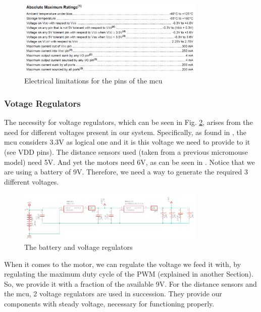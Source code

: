 \begin{figure}[htb]
    \centering
    \includegraphics[width=0.8\textwidth]{figures/hardware/Electrical.PNG}
    \caption{Electrical limitations for the pins of the mcu}
    \label{fig:electrical}
\end{figure}

\FloatBarrier


\subsubsection{Votage Regulators}

The necessity for voltage regulators, which can be seen in Fig. \ref{fig:battery}, arises from the need for different voltages present in our system. 
Specifically, as found in \cite{mcu}, the mcu considers 3.3V as logical one and it is this voltage we need to provide to it (see VDD pins). The distance sensors used (taken from a previous micromouse model) need 5V. And yet the motors need 6V, as can be seen in \cite{motor}. 
Notice that we are using a battery of 9V. Therefore, we need a way to generate the required 3 different voltages.

\begin{figure}[htb]
    \centering
    \includegraphics[width=0.8\textwidth]{figures/hardware/VoltageandCapacitors.PNG}
    \caption{The battery and voltage regulators}
    \label{fig:battery}
\end{figure}

\FloatBarrier

When it comes to the motor, we can regulate the voltage we feed it with, by regulating the maximum duty cycle of the PWM (explained in another Section). So, we provide it with a fraction of the available 9V.
For the distance sensors and the mcu, 2 voltage regulators are used in succession. They provide our components with steady voltage, necessary for functioning properly.

